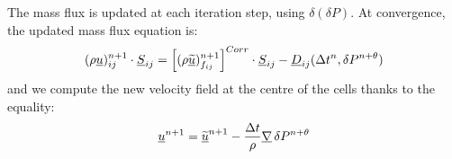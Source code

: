 The mass flux is updated at each iteration step, using $\delta(\delta P)$. At convergence, the updated mass flux equation is:
\begin{equation}
(\rho \underline{u})^{n+1}_{{ij}} \cdot \underline{S}_{{ij}} =
\left[(\rho
\underline{\widetilde{u}})^{n+1}_{{f_{ij}}}\right]^{Corr} \cdot \underline{S}_{{ij}}-\underline{D}_{{ij}}(\Delta
t^n,\delta P^{n+\theta})
\end{equation}
and we compute the new velocity field at the centre of the cells thanks
to the equality:
%
\begin{equation}
\underline{u}^{n+1} =
\underline{\widetilde{u}}^{n+1}-\frac{\Delta t}{\rho}\underline{\nabla} \,\delta P^{n+\theta}
\end{equation}
%


